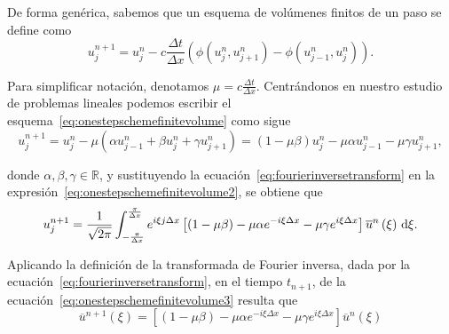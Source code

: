 \begin{frame}
    \frametitle{\secname}

    De forma genérica, sabemos que un esquema de volúmenes finitos de un
    paso se define como
    \begin{equation}\label{eq:onestepschemefinitevolume}
        u^{n+1}_{j}=
        u^{n}_{j}-
        c\frac{\Delta t}{\Delta x}
        \left(
        \phi\left(u^{n}_{j},u^{n}_{j+1}\right)-
        \phi\left(u^{n}_{j-1},u^{n}_{j}\right)
        \right).
    \end{equation}

    Para simplificar notación, denotamos
    \begin{math}
        \mu=
        c\frac{\Delta t}{\Delta x}
    \end{math}.
    Centrándonos en nuestro estudio de problemas lineales podemos
    escribir el esquema~\eqref{eq:onestepschemefinitevolume} como sigue
    \begin{equation}\label{eq:onestepschemefinitevolume2}
        u^{n+1}_{j}=
        u^{n}_{j}-
        \mu
        \left(
        \alpha u^{n}_{j-1}+
        \beta u^{n}_{j}+
        \gamma u^{n}_{j+1}
        \right)=
        \left(1-\mu\beta\right)
        u_j^n-
        \mu\alpha
        u^{n}_{j-1}-
        \mu\gamma
        u^{n}_{j+1},
    \end{equation}

    donde $\alpha,\beta,\gamma\in\mathbb{R}$, y sustituyendo la
    ecuación~\eqref{eq:fourierinversetransform} en la
    expresión~\eqref{eq:onestepschemefinitevolume2}, se obtiene que
    \begin{equation}\label{eq:onestepschemefinitevolume3}
        u^{n+1}_{j}=
        \frac{1}{\sqrt{2\pi}}
        \int_{-\frac{\pi}{\Delta x}}^{\frac{\pi}{\Delta x}}
        e^{i\xi j\Delta x}
        \left[
            \left(1-\mu\beta\right)-
            \mu\alpha
            e^{-i\xi\Delta x}-
            \mu\gamma
            e^{i\xi\Delta x}
            \right]
        \overline{u}^{n}\left(\xi\right)
        \dl\xi.
    \end{equation}

    Aplicando la definición de la transformada de Fourier inversa, dada
    por la ecuación~\eqref{eq:fourierinversetransform}, en el tiempo
    $t_{n+1}$, de la ecuación~\eqref{eq:onestepschemefinitevolume3}
    resulta que
    \begin{equation*}
        \overline{u}^{n+1}
        \left(\xi\right)=
        \left[
            \left(1-\mu\beta\right)-
            \mu\alpha
            e^{-i\xi\Delta x}-
            \mu\gamma e^{i\xi\Delta x}
            \right]
        \overline{u}^{n}
        \left(\xi\right)
    \end{equation*}


\end{frame}

